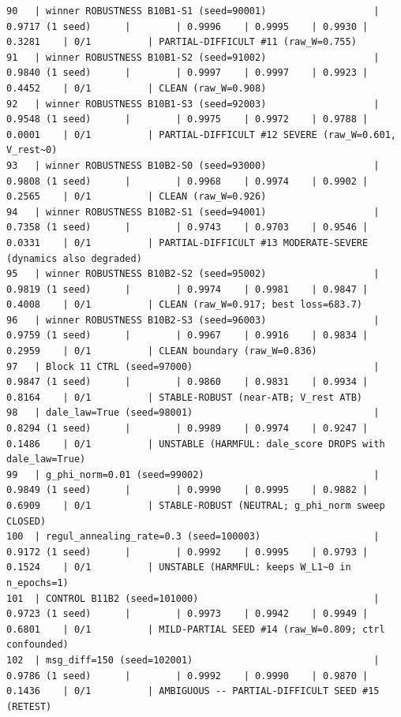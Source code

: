 \documentclass{article}
\begin{document}
\begin{tiny}
\begin{verbatim}
90   | winner ROBUSTNESS B10B1-S1 (seed=90001)                   | 0.9717 (1 seed)      |        | 0.9996    | 0.9995    | 0.9930 | 0.3281    | 0/1          | PARTIAL-DIFFICULT #11 (raw_W=0.755)
91   | winner ROBUSTNESS B10B1-S2 (seed=91002)                   | 0.9840 (1 seed)      |        | 0.9997    | 0.9997    | 0.9923 | 0.4452    | 0/1          | CLEAN (raw_W=0.908)
92   | winner ROBUSTNESS B10B1-S3 (seed=92003)                   | 0.9548 (1 seed)      |        | 0.9975    | 0.9972    | 0.9788 | 0.0001    | 0/1          | PARTIAL-DIFFICULT #12 SEVERE (raw_W=0.601, V_rest~0)
93   | winner ROBUSTNESS B10B2-S0 (seed=93000)                   | 0.9808 (1 seed)      |        | 0.9968    | 0.9974    | 0.9902 | 0.2565    | 0/1          | CLEAN (raw_W=0.926)
94   | winner ROBUSTNESS B10B2-S1 (seed=94001)                   | 0.7358 (1 seed)      |        | 0.9743    | 0.9703    | 0.9546 | 0.0331    | 0/1          | PARTIAL-DIFFICULT #13 MODERATE-SEVERE (dynamics also degraded)
95   | winner ROBUSTNESS B10B2-S2 (seed=95002)                   | 0.9819 (1 seed)      |        | 0.9974    | 0.9981    | 0.9847 | 0.4008    | 0/1          | CLEAN (raw_W=0.917; best loss=683.7)
96   | winner ROBUSTNESS B10B2-S3 (seed=96003)                   | 0.9759 (1 seed)      |        | 0.9967    | 0.9916    | 0.9834 | 0.2959    | 0/1          | CLEAN boundary (raw_W=0.836)
97   | Block 11 CTRL (seed=97000)                                | 0.9847 (1 seed)      |        | 0.9860    | 0.9831    | 0.9934 | 0.8164    | 0/1          | STABLE-ROBUST (near-ATB; V_rest ATB)
98   | dale_law=True (seed=98001)                                | 0.8294 (1 seed)      |        | 0.9989    | 0.9974    | 0.9247 | 0.1486    | 0/1          | UNSTABLE (HARMFUL: dale_score DROPS with dale_law=True)
99   | g_phi_norm=0.01 (seed=99002)                              | 0.9849 (1 seed)      |        | 0.9990    | 0.9995    | 0.9882 | 0.6909    | 0/1          | STABLE-ROBUST (NEUTRAL; g_phi_norm sweep CLOSED)
100  | regul_annealing_rate=0.3 (seed=100003)                    | 0.9172 (1 seed)      |        | 0.9992    | 0.9995    | 0.9793 | 0.1524    | 0/1          | UNSTABLE (HARMFUL: keeps W_L1~0 in n_epochs=1)
101  | CONTROL B11B2 (seed=101000)                               | 0.9723 (1 seed)      |        | 0.9973    | 0.9942    | 0.9949 | 0.6801    | 0/1          | MILD-PARTIAL SEED #14 (raw_W=0.809; ctrl confounded)
102  | msg_diff=150 (seed=102001)                                | 0.9786 (1 seed)      |        | 0.9992    | 0.9990    | 0.9870 | 0.1436    | 0/1          | AMBIGUOUS -- PARTIAL-DIFFICULT SEED #15 (RETEST)

\end{verbatim}
\end{tiny}
\end{document}
